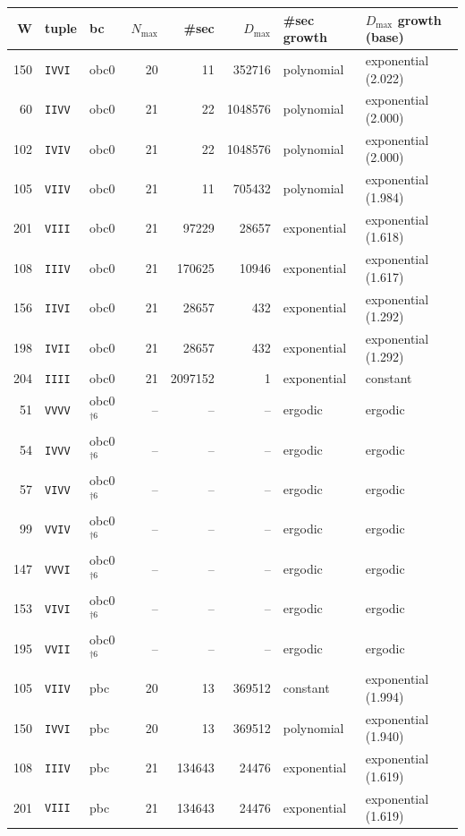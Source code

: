\begin{tabular}{@{}rl l r rr l l@{}}
\toprule
W & tuple & bc & $N_{\max}$ & \#sec & $D_{\max}$ & \#sec growth & $D_{\max}$ growth (base) \\
\midrule
150 & \texttt{IVVI} & obc0 & 20 & 11 & 352716 & polynomial & exponential (2.022) \\
60 & \texttt{IIVV} & obc0 & 21 & 22 & 1048576 & polynomial & exponential (2.000) \\
102 & \texttt{IVIV} & obc0 & 21 & 22 & 1048576 & polynomial & exponential (2.000) \\
105 & \texttt{VIIV} & obc0 & 21 & 11 & 705432 & polynomial & exponential (1.984) \\
201 & \texttt{VIII} & obc0 & 21 & 97229 & 28657 & exponential & exponential (1.618) \\
108 & \texttt{IIIV} & obc0 & 21 & 170625 & 10946 & exponential & exponential (1.617) \\
156 & \texttt{IIVI} & obc0 & 21 & 28657 & 432 & exponential & exponential (1.292) \\
198 & \texttt{IVII} & obc0 & 21 & 28657 & 432 & exponential & exponential (1.292) \\
204 & \texttt{IIII} & obc0 & 21 & 2097152 & 1 & exponential & constant \\
51 & \texttt{VVVV} & obc0$^{\dagger6}$ & -- & -- & -- & ergodic & ergodic \\
54 & \texttt{IVVV} & obc0$^{\dagger6}$ & -- & -- & -- & ergodic & ergodic \\
57 & \texttt{VIVV} & obc0$^{\dagger6}$ & -- & -- & -- & ergodic & ergodic \\
99 & \texttt{VVIV} & obc0$^{\dagger6}$ & -- & -- & -- & ergodic & ergodic \\
147 & \texttt{VVVI} & obc0$^{\dagger6}$ & -- & -- & -- & ergodic & ergodic \\
153 & \texttt{VIVI} & obc0$^{\dagger6}$ & -- & -- & -- & ergodic & ergodic \\
195 & \texttt{VVII} & obc0$^{\dagger6}$ & -- & -- & -- & ergodic & ergodic \\
105 & \texttt{VIIV} & pbc & 20 & 13 & 369512 & constant & exponential (1.994) \\
150 & \texttt{IVVI} & pbc & 20 & 13 & 369512 & polynomial & exponential (1.940) \\
108 & \texttt{IIIV} & pbc & 21 & 134643 & 24476 & exponential & exponential (1.619) \\
201 & \texttt{VIII} & pbc & 21 & 134643 & 24476 & exponential & exponential (1.619) \\

\end{tabular}

